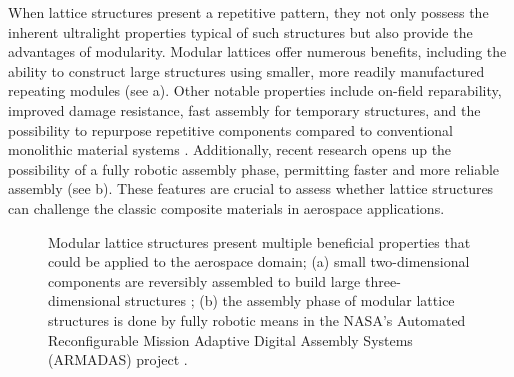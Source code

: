 When lattice structures present a repetitive pattern, they not only possess the inherent ultralight properties typical of such structures but also provide the advantages of modularity. Modular lattices offer numerous benefits, including the ability to construct large structures using smaller, more readily manufactured repeating modules (see a). Other notable properties include on-field reparability, improved damage resistance, fast assembly for temporary structures, and the possibility to repurpose repetitive components compared to conventional monolithic material systems . Additionally, recent research opens up the possibility of a fully robotic assembly phase, permitting faster and more reliable assembly (see b). These features are crucial to assess whether lattice structures can challenge the classic composite materials in aerospace applications.

\begin{figure}
    \hspace*{\fill}
    \hfill
    \hspace*{\fill}
    \caption{Modular lattice structures present multiple beneficial properties that could be applied to the aerospace domain; (a) small two-dimensional components are reversibly assembled to build large three-dimensional structures \cite{cheung_reversibly_2013}; (b) the assembly phase of modular lattice structures is done by fully robotic means in the NASA's Automated Reconfigurable Mission Adaptive Digital Assembly Systems (ARMADAS) project \cite{costa_algorithmic_2020}.}
    \label{fig:01_fab}
\end{figure}

